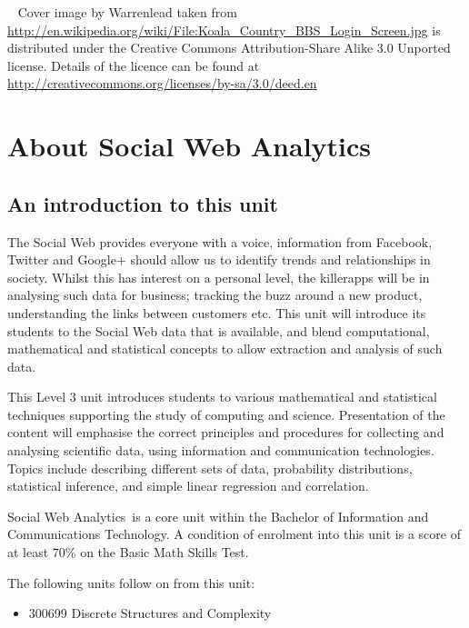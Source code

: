 \documentclass[a4paper,oneside]{book}
\newcommand{\unitname}{Social Web Analytics}
\begin{document}
~
\vfill
\noindent
Cover image by Warrenlead taken from
\url{http://en.wikipedia.org/wiki/File:Koala_Country_BBS_Login_Screen.jpg}
is distributed under the Creative Commons Attribution-Share Alike 3.0 Unported 
license. Details of the licence can be found at
\url{http://creativecommons.org/licenses/by-sa/3.0/deed.en}

\newpage

\tableofcontents

\chapter{About \unitname}

\section{An introduction to this unit}


The Social Web provides everyone with a voice, information from
Facebook, Twitter and Google+ should allow us to identify trends and
relationships in society. Whilst this has interest on a personal
level, the killer­apps will be in analysing such data for business;
tracking the buzz around a new product, understanding the links
between customers etc. This unit will introduce its students to the
Social Web data that is available, and blend computational,
mathematical and statistical concepts to allow extraction and analysis
of such data.

This Level 3 unit introduces students to various mathematical and statistical
techniques supporting the study of computing and science. Presentation
of the content will emphasise the correct principles and procedures
for collecting and analysing scientific data, using information and
communication technologies. Topics include describing different sets
of data, probability distributions, statistical inference, and simple
linear regression and correlation.


\unitname~is a core unit within the Bachelor of Information and
Communications Technology. A condition of enrolment into this unit is
a score of at least 70\% on the Basic Math Skills Test.

The following units follow on from this unit: 
\begin{itemize}
\item 300699 Discrete Structures and Complexity
\end{itemize}
\end{document}
